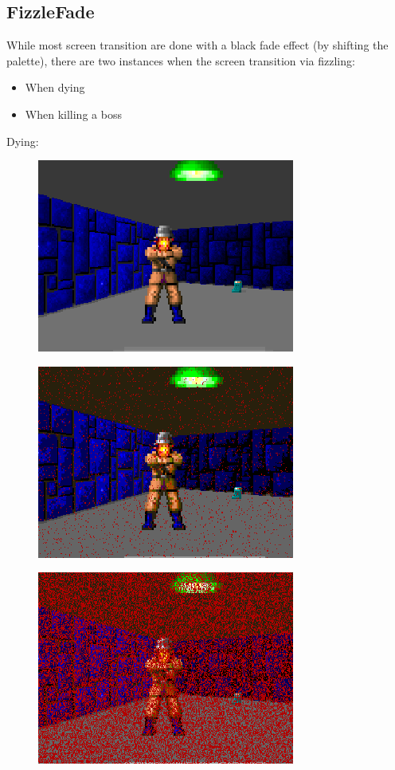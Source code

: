 \subsection{FizzleFade}
While most screen transition are done with a black fade effect (by shifting the palette), there are two instances
when the screen transition via fizzling:
\begin{itemize}
	\item When dying
	\item When killing a boss
\end{itemize}


Dying:\\
  \begin{figure}[H] \centering \includegraphics[scale=1.0]{imgs/fizzlefade/dying/screenshot_16.png} \end{figure}
    \begin{figure}[H] \centering \includegraphics[scale=1.0]{imgs/fizzlefade/dying/screenshot_19.png} \end{figure}
      \begin{figure}[H] \centering \includegraphics[scale=1.0]{imgs/fizzlefade/dying/screenshot_52.png} \end{figure}
